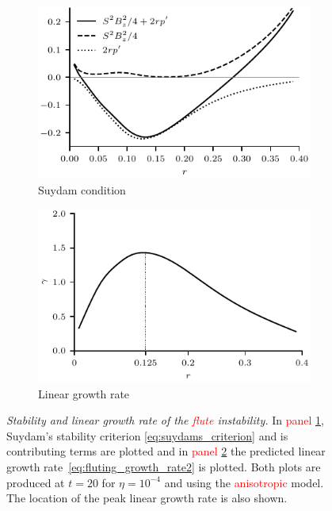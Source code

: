 \documentclass[12pt]{article}
\newcommand{\rs}[2]{\textcolor{red}{#2}}
\newcommand{\mycaption}[2]{\caption[#1]{\emph{#1} #2}}
\begin{document}
\begin{figure}[t]
  \centering
    \begin{subfigure}{0.49\textwidth}
      \includegraphics[width=\linewidth]{suydam_condition_4.pdf}
      \caption{Suydam condition}
      \label{fig:suydam_condition_4}
    \end{subfigure}
    \hfill
    \begin{subfigure}{0.49\textwidth}
      \includegraphics[width=\linewidth]{growth_rate_4.pdf}
      \caption{Linear growth rate}
      \label{fig:growth_rate_4}
    \end{subfigure}
\mycaption{Stability and linear growth rate of the \rs{fluting}{flute}
  instability.}{In \rs{}{panel} \ref{fig:suydam_condition_4}, Suydam's stability
  criterion \rs{}{\eqref{eq:suydams_criterion}} and is contributing
  terms \rs{(LHS of~\eqref{eq:suydams_criterion})}{}  are plotted and in
  \rs{}{panel} \ref{fig:growth_rate_4} the predicted linear growth rate~\eqref{eq:fluting_growth_rate2} is plotted. Both plots are produced at $t=20$ for $\eta=10^{-4}$ and using the \rs{switching}{anisotropic} model. The location of the peak linear growth rate is also shown.}
\label{fig:stability_and_growth}%
\end{figure}
\end{document}
